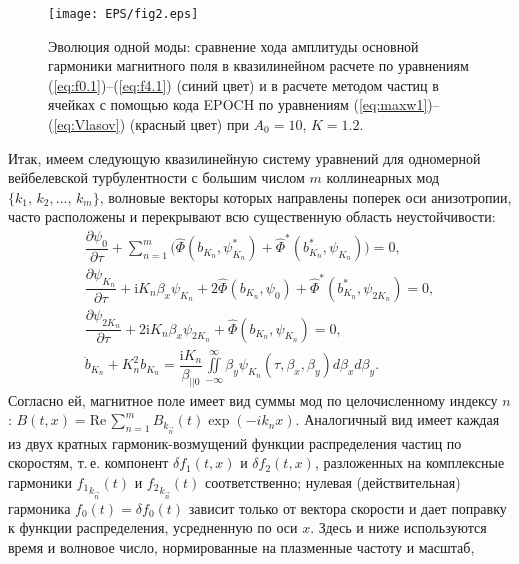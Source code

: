 \begin{figure}[b]
\texttt{[image: EPS/fig2.eps]}
\centering
\caption{Эволюция одной моды: сравнение хода амплитуды основной гармоники магнитного поля в квазилинейном расчете по уравнениям (\ref{eq:f0.1})--(\ref{eq:f4.1}) (синий цвет) и в расчете методом частиц в ячейках с помощью кода EPOCH по уравнениям (\ref{eq:maxw1})--(\ref{eq:Vlasov}) (красный цвет) при $A_0=10$, $K=1.2$.}
\label{fig:srav_PIC}
\end{figure}

Итак, имеем следующую квазилинейную систему уравнений для одномерной вейбелевской турбулентности с большим числом $m$ коллинеарных мод $\{ k_1,\, k_2,...,\,k_{m} \}$, волновые векторы которых направлены поперек оси анизотропии, часто расположены и перекрывают всю существенную область неустойчивости: 
\begin{align}
\label{eq:f0.3}
\dfrac{\partial \psi_0}{\partial \tau}+\sum\limits^{m}_{n=1}\bigg(\hat \Phi(b_{K_n},\psi_{K_n}^*)+\hat \Phi^*(b_{K_n}^*,\psi_{K_n})\bigg)=0, \\
\label{eq:f1.3}
\dfrac{\partial \psi_{K_n}}{\partial \tau}+\mathrm{i}K_n\beta_x\psi_{K_n}+2\hat \Phi(b_{K_n},\psi_0)+\hat \Phi^*(b_{K_n}^*,\psi_{2K_n})=0, \\
\label{eq:f2.3}
\dfrac{\partial \psi_{2K_n}}{\partial \tau}+2\mathrm{i}K_n\beta_x\psi_{2K_n}+\hat \Phi(b_{K_n},\psi_{K_n})=0,\\
\label{eq:max_eq}
\ddot b_{K_n}+K_n^2b_{K_n}=\dfrac{\mathrm{i}K_n}{\beta_{||0}}\iint\limits^{\infty}_{-\infty}\beta_y\psi_{K_n}(\tau,\beta_x,\beta_y) d\beta_x d\beta_y.
\end{align}
Согласно ей, магнитное поле имеет вид суммы мод по целочисленному индексу $n$:
$B(t,x)= \mathrm{Re} \, \sum^{m}_{n=1}B_{k_{\vec{n}}}(t)\exp(- ik_{n}x)$.
Аналогичный вид имеет каждая из двух кратных гармоник-возмущений функции распределения частиц по скоростям, т.\,е. компонент $\delta f_1(t,x)$ и $\delta f_2(t,x)$, разложенных на комплексные гармоники ${f_1}_{k_{\vec{n}}}(t)$ и ${f_2}_{k_{\vec{n}}}(t)$ соответственно; нулевая (действительная) гармоника $f_0(t)=\delta f_0(t)$ зависит только от вектора скорости и дает поправку к функции распределения, усредненную по оси $x$. Здесь и ниже используются время и волновое число, нормированные на плазменные частоту и масштаб,
